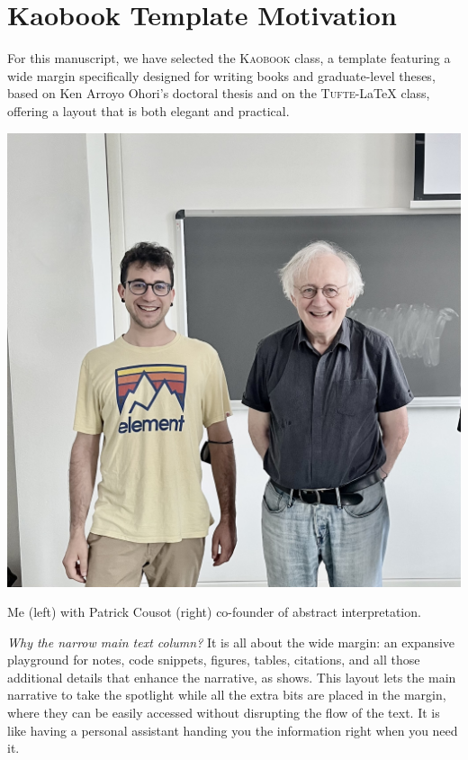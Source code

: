 \def\customcitkey{Urban2018}\def\absintkey{Cousot1977}



\chapter*{Kaobook Template Motivation}

For this manuscript, we have selected the \textsc{Kaobook} class, a template featuring a wide margin specifically designed for writing books and graduate-level theses, based on Ken Arroyo Ohori's doctoral thesis and on the \textsc{Tufte}-\LaTeX{} class, offering a layout that is both elegant and practical.

\marginnote{\formatmargincitation{\absintkey}}
\begin{marginfigure}
  \centering
  \includegraphics[width=\textwidth]{figures/denis-patrick}
  \caption{Me (left) with Patrick Cousot (right) co-founder of abstract interpretation\cite{\absintkey}.}
\end{marginfigure}

\emph{Why the narrow main text column?} It is all about the wide margin: an expansive playground for notes, code snippets, figures, tables, citations, and all those additional details that enhance the narrative, as  shows.
This layout lets the main narrative to take the spotlight while all the extra bits are placed in the margin, where they can be easily accessed without disrupting the flow of the text. It is like having a personal assistant handing you the information right when you need it.

